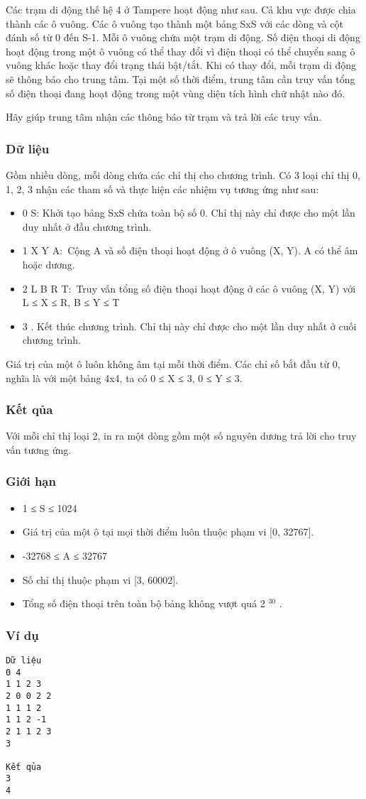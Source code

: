 

Các trạm di động thế hệ 4 ở Tampere hoạt động như sau. Cả khu vực được chia thành các ô vuông. Các ô vuông tạo thành một bảng SxS với các dòng và cột đánh số từ 0 đến S-1. Mỗi ô vuông chứa một trạm di động. Số điện thoại di động hoạt động trong một ô vuông có thể thay đổi vì điện thoại có thể chuyển sang ô vuông khác hoặc thay đổi trạng thái bật/tắt. Khi có thay đổi, mỗi trạm di động sẽ thông báo cho trung tâm. Tại một số thời điểm, trung tâm cần truy vấn tổng số điện thoại đang hoạt động trong một vùng diện tích hình chữ nhật nào đó.

Hãy giúp trung tâm nhận các thông báo từ trạm và trả lời các truy vấn.

\subsubsection{Dữ liệu}

Gồm nhiều dòng, mỗi dòng chứa các chỉ thị cho chương trình. Có 3 loại chỉ thị 0, 1, 2, 3 nhận các tham số và thực hiện các nhiệm vụ tương ứng như sau:
\begin{itemize}
	\item 0 S: Khởi tạo bảng SxS chứa toàn bộ số 0. Chỉ thị này chỉ được cho một lần duy nhất ở đầu chương trình.
	\item 1 X Y A: Cộng A và số điện thoại hoạt động ở ô vuông (X, Y). A có thể âm hoặc dương.
	\item 2 L B R T: Truy vấn tổng số điện thoại hoạt động ở các ô vuông (X, Y) với L ≤ X ≤ R, B ≤ Y ≤ T
	\item 3 . Kết thúc chương trình. Chỉ thị này chỉ được cho một lần duy nhất ở cuối chương trình.
\end{itemize}

Giá trị của một ô luôn không âm tại mỗi thời điểm. Các chỉ số bắt đầu từ 0, nghĩa là với một bảng 4x4, ta có 0 ≤ X ≤ 3, 0 ≤ Y ≤ 3.

\subsubsection{Kết qủa}

Với mỗi chỉ thị loại 2, in ra một dòng gồm một số nguyên dương trả lời cho truy vấn tương ứng.

\subsubsection{Giới hạn}
\begin{itemize}
	\item 1 ≤ S ≤ 1024
	\item Giá trị của một ô tại mọi thời điểm luôn thuộc phạm vi [0, 32767].
	\item -32768 ≤ A ≤ 32767
	\item Số chỉ thị thuộc phạm vi [3, 60002].
	\item Tổng số điện thoại trên toàn bộ bảng không vượt quá 2 $^ 30 $ .
\end{itemize}

\subsubsection{Ví dụ}
\begin{verbatim}
Dữ liệu
0 4  		
1 1 2 3  		
2 0 0 2 2
1 1 1 2
1 1 2 -1
2 1 1 2 3
3

Kết qủa
3
4
\end{verbatim}